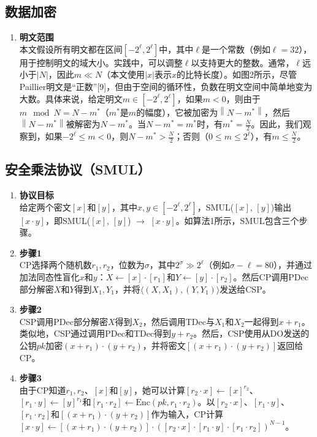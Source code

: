 \subsection{数据加密}
\begin{enumerate}[leftmargin=*, nosep]
    \item \textbf{明文范围}  \\
    本文假设所有明文都在区间\([-2^{\ell}, 2^{\ell}]\)中，其中\(\ell\)是一个常数（例如\(\ell = 32\)），用于控制明文的域大小。实践中，可以调整\(\ell\)以支持更大的整数。通常，\(\ell\)远小于\(|N|\)，因此\(m \ll N\)（本文使用\(|x|\)表示\(x\)的比特长度）。如图2所示，尽管Paillier明文是“正数”[9]，但由于空间的循环性，负数在明文空间中简单地变为大数。具体来说，给定明文\( m \in [-2^{\ell}, 2^{\ell}] \)，如果\( m < 0 \)，则由于\( m \mod N = N - m^{*} \)（\( m^{*} \)是\( m \)的幅度），它被加密为\(\left\|N - m^{*}\right\|\)，然后\(\left\|N - m^{*}\right\|\)被解密为\( N - m^{*} \)。当\( N - m^{*} = m^{*} \)时，有\( m^{*} = \frac{N}{2} \)。因此，我们观察到，如果\( -2^{\ell} \leq m < 0 \)，则\( N - m^{*} > \frac{N}{2} \)；否则（\( 0 \leq m \leq 2^{\ell} \)），有\( m \leq \frac{N}{2} \)。
\end{enumerate}

\subsection{安全乘法协议（SMUL）}
\begin{enumerate}[leftmargin=*, nosep]
    \item \textbf{协议目标}  \\
    给定两个密文\([x]\)和\([y]\)，其中\( x, y \in [-2^{\ell}, 2^{\ell}] \)，SMUL(\([x]\), \([y]\))输出\([x \cdot y]\)，即SMUL(\([x]\), \([y]\)) \(\rightarrow\) \([x \cdot y]\)。如算法1所示，SMUL包含三个步骤。
    \item \textbf{步骤1}  \\
    CP选择两个随机数\( r_1, r_2 \)，位数为\(\sigma\)，其中\( 2^{\sigma} \gg 2^{\ell} \)（例如\(\sigma - \ell = 80\)），并通过加法同态性盲化\( x \)和\( y \)：\( X \leftarrow [x] \cdot [r_1] \)和\( Y \leftarrow [y] \cdot [r_2] \)。然后CP调用PDec部分解密\( X \)和\( Y \)得到\( X_1, Y_1 \)，并将\(\langle(X, X_1), (Y, Y_1)\rangle\)发送给CSP。
    \item \textbf{步骤2}  \\
    CSP调用PDec部分解密\( X \)得到\( X_2 \)，然后调用TDec与\( X_1 \)和\( X_2 \)一起得到\( x + r_1 \)。类似地，CSP通过调用PDec和TDec得到\( y + r_2 \)。然后，CSP使用从DO发送的公钥\( pk \)加密\( (x + r_1) \cdot (y + r_2) \)，并将密文\([(x + r_1) \cdot (y + r_2)]\)返回给CP。
    \item \textbf{步骤3}  \\
    由于CP知道\( r_1, r_2 \)、\([x]\)和\([y]\)，她可以计算\([r_2 \cdot x] \leftarrow [x]^{r_2} \)、\([r_1 \cdot y] \leftarrow [y]^{r_1} \)和\([r_1 \cdot r_2] \leftarrow \text{Enc}(pk, r_1 \cdot r_2) \)。以\([r_2 \cdot x] \)、\([r_1 \cdot y] \)、\([r_1 \cdot r_2] \)和\([(x + r_1) \cdot (y + r_2)] \)作为输入，CP计算\([x \cdot y] \leftarrow [(x + r_1) \cdot (y + r_2)] \cdot ([r_2 \cdot x] \cdot [r_1 \cdot y] \cdot [r_1 \cdot r_2])^{N-1} \)。
\end{enumerate}

